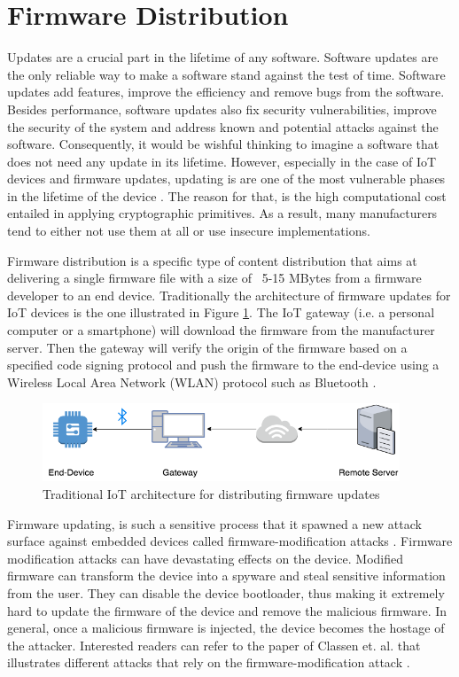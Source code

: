 {\section{Firmware Distribution}{

Updates are a crucial part in the lifetime of any software. Software updates are the only reliable way to make a software stand against the test of time. Software updates add features, improve the efficiency and remove bugs from the software. Besides performance, software updates also fix security vulnerabilities, improve the security of the system and address known and potential attacks against the software. Consequently, it would be wishful thinking to imagine a software that does not need any update in its lifetime. However, especially in the case of IoT devices and firmware updates, updating is are one of the most vulnerable phases in the lifetime of the device \cite{Shamir2017SummaryCryptography}. The reason for that, is the high computational cost entailed in applying cryptographic primitives. As a result, many manufacturers tend to either not use them at all or use insecure implementations.

Firmware distribution is a specific type of content distribution that aims at delivering a single firmware file with a size of ~5-15 MBytes from a firmware developer to an end device. Traditionally the architecture of firmware updates for IoT devices is the one illustrated in Figure \ref{fig:FirmUpd}. The IoT gateway (i.e. a personal computer or a smartphone) will download the firmware from the manufacturer server. Then the gateway will verify the origin of the firmware based on a specified code signing protocol and push the firmware to the end-device using a Wireless Local Area Network (WLAN) protocol such as Bluetooth \cite{fitbit}.

\begin{figure}[htb!]
\centering
\includegraphics[width=0.95\textwidth]{./pics/Firmware_updates.png}
\caption{Traditional IoT architecture for distributing firmware updates}
\label{fig:FirmUpd}
\end{figure}

Firmware updating, is such a sensitive process that it spawned a new attack surface against embedded devices called firmware-modification attacks \cite{7804660}. Firmware modification attacks can have devastating effects on the device. Modified firmware can transform the device into a spyware and steal sensitive information from the user. They can disable the device bootloader, thus making it extremely hard to update the firmware of the device and remove the malicious firmware. In general, once a malicious firmware is injected, the device becomes the hostage of the attacker. Interested readers can refer to the paper of Classen et. al. that illustrates different attacks that rely on the firmware-modification attack \cite{Classen2018AnatomyFirmware}.
}

}
